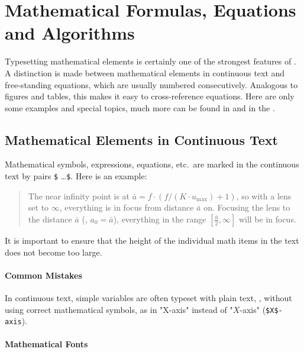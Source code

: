 \chapter[Mathematical Formulas etc.]{Mathematical Formulas, Equations and Algorithms}
\label{cha:Mathematics}


Typesetting mathematical elements is certainly one of the strongest features of
\latex. A distinction is made between mathematical elements in continuous text
and free-standing equations, which are usually numbered consecutively.
Analogous to figures and tables, this makes it easy to cross-reference equations.
Here are only some examples and special topics, much more can be found in
\cite[Ch.\ 7]{Kopka2003} and in the  \cite{Downes2017}.


\section{Mathematical Elements in Continuous Text}

Mathematical symbols, expressions, equations, etc.\ are marked in the continuous
text by pairs \verb!$! \ldots \verb!$!. Here is an example:
%
\begin{quote}
	The near infinity point is at $\bar{a} = f \cdot (f / (K \cdot u_{\max}) + 1)$, 
	so with a lens set to $\infty$, everything is in focus from distance $\bar{a}$ on.
	Focusing the lens to the distance $\bar{a}$ (\ie, $a_0 = \bar{a}$), everything
	in the range $[\frac{\bar{a}}{2}, \infty]$ will be in focus.
\end{quote}
%
It is important to ensure that the height of the individual math items in the text
does not become too large.

\subsubsection{Common Mistakes}

In continuous text, simple variables are often typeset with plain text,
\ie, without using correct mathematical symbols, as in "X-axis" instead of 
"$X$-axis" (\verb!$X$-axis!).


\subsubsection{Mathematical Fonts}

